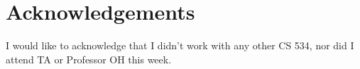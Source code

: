 \documentclass[a4paper,12pt]{article}
\theoremstyle{definition}
\theoremstyle{remark}
\begin{document}
	
	
	
	\section*{Acknowledgements}
	I would like to acknowledge that I didn't work with any other CS 534, nor did I attend TA or Professor OH this week.
	
\end{document}
